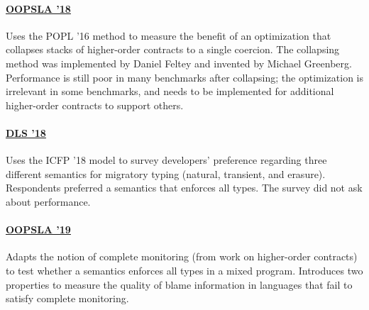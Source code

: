 \documentclass[10pt]{article}
\begin{document}
\paragraph{\href{https://www2.ccs.neu.edu/racket/pubs/oopsla18-fgsfs.pdf}{OOPSLA '18}}
Uses the POPL '16 method to measure the benefit of an optimization that collapses
 stacks of higher-order contracts to a single coercion.
The collapsing method was implemented by Daniel Feltey and invented by
 Michael Greenberg.
Performance is still poor in many benchmarks after collapsing; the optimization
 is irrelevant in some benchmarks, and needs to be implemented for additional
 higher-order contracts to support others.


\paragraph{\href{https://www2.ccs.neu.edu/racket/pubs/dls18-bg.pdf}{DLS '18}}
Uses the ICFP '18 model to survey developers' preference regarding 
 three different semantics for migratory typing (natural, transient, and erasure).
Respondents preferred a semantics that enforces all types.
The survey did not ask about performance.


\paragraph{\href{https://www2.ccs.neu.edu/racket/pubs/oopsla19-gfd.pdf}{OOPSLA '19}}
Adapts the notion of complete monitoring (from work on higher-order contracts)
 to test whether a semantics enforces all types in a mixed program.
Introduces two properties to measure the quality of blame information in
 languages that fail to satisfy complete monitoring.
\end{document}
